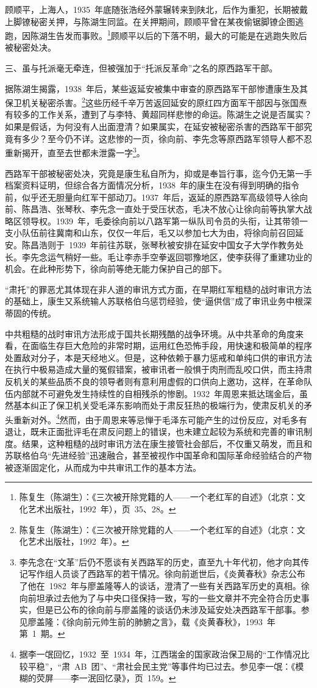 顾顺平，上海人，1935~年底随张浩经外蒙辗转来到陕北，后作为重犯，长期被戴上脚镣秘密关押，与陈湖生同监。在关押期间，顾顺平曾在某夜偷锯脚镣企图逃跑，因陈湖生告发而事败。\footnote{陈复生（陈湖生）：《三次被开除党籍的人——一个老红军的自述》（北京：文化艺术出版社，1992~年），页~35、28。}顾顺平以后的下落不明，最大的可能是在逃跑失败后被秘密处决。

三、虽与托派毫无牵连，但被强加于“托派反革命”之名的原西路军干部。

据陈湖生揭露，1938~年后，某些返延安被集中审查的原西路军干部惨遭康生及其保卫机关秘密杀害。\footnote{陈复生（陈湖生）：《三次被开除党籍的人——一个老红军的自述》（北京：文化艺术出版社，1992~年）。}这些历经千辛万苦返回延安的原红四方面军干部因与张国焘有较多的工作关系，遭到了与李特、黄超同样悲惨的命运。陈湖生之说是否属实？如果是假话，为何没有人出面澄清？如果属实，在延安被秘密杀害的西路军干部究竟有多少？至今仍不详。这悲惨的一页，徐向前、李先念等原西路军领导人都不忍重新揭开，直至去世都未泄露一字\footnote{李先念在“文革”后仍不愿谈有关西路军的历史，直至九十年代初，他才向其传记写作组人员谈了西路军的若干情况。徐向前逝世后，《炎黄春秋》杂志公布了他在~1982~年与廖盖隆等人的谈话，澄清了一些有关西路军历史的真相。徐向前坦承过去他为了与中央口径保持一致，写的一些文章并不完全符合历史事实，但是已公布的徐向前与廖盖隆的谈话仍未涉及延安处决西路军干部事。参见廖盖隆：《徐向前元帅生前的肺腑之言》，载《炎黄春秋》，1993~年第~1~期。}。

西路军干部被秘密处决，究竟是康生私自所为，抑或是奉旨行事，迄今仍无第一手档案资料证明，但综合各方面情况分析，1938~年的康生在没有得到明确的指令前，似乎还无胆量向红军干部动刀。1937~年后，返延的原西路军高级领导人徐向前、陈昌浩、张琴秋、李先念一直处于受压状态，毛决不放心让徐向前等执掌大战略区领导权。1939~年，毛委徐向前以八路军第一纵队司令员的头衔，让其带领一支小队伍前往冀南和山东，仅仅一年后，毛又以参加七大为由，将徐向前召回延安。陈昌浩则于~1939~年前往苏联，张琴秋被安排在延安中国女子大学作教务处长。李先念运气稍好一些。毛让李赤手空拳返回鄂豫地区，使李获得了重建功业的机会。在此种形势下，徐向前等绝无能力保护自己的部下。

“肃托”的罪恶尤其体现在非人道的审讯方式方面，在早期红军粗糙的战时审讯方法的基础上，康生又系统输人苏联格伯乌惩罚经验，使“逼供信”成了审讯业务中根深蒂固的传统。

中共粗糙的战时审讯方法形成于国共长期残酷的战争环境。从中共革命的角度来看，在面临生存巨大危险的非常时期，运用红色恐怖手段，用快速和极简单的程序处置敌对分子，本是天经地义。但是，这种依赖于暴力惩戒和单纯口供的审讯方法在执行中极易造成大量的冤假错案，被审讯者一般惧于肉刑而乱咬口供，而主持肃反机关的某些品质不良的领导者则有意利用虚假的口供向上邀功，这样，在革命队伍内部就不可避免发生持续性的自相残杀的惨剧。1932~年周恩来抵达瑞金后，虽然基本纠正了保卫机关受毛泽东影响而处于肃反狂热的极端行为，使肃反机关的矛头重新对外。\footnote{据李一氓回忆，1932~至~1934~年，江西瑞金的国家政治保卫局的“工作情况比较平稳”，“肃~AB~团”、“肃社会民主党”等事件均已过去。参见李一氓：《模糊的荧屏——李一泯回忆录》，页~159。}然而，由于周恩来等忌惮于毛泽东可能产生的过份反应，对毛多有退让，既未正面批评毛在肃反问题上的错误，也未建立起较为系统和完善的审讯制度。结果，这种粗糙的战时审讯方法在康生接管社会部后，不仅重又萌发，而且和苏联格伯乌“先进经验”迅速融合，甚至被视作中国革命和国际革命经验结合的产物被逐渐固定化，从而成为中共审讯工作的基本方法。

